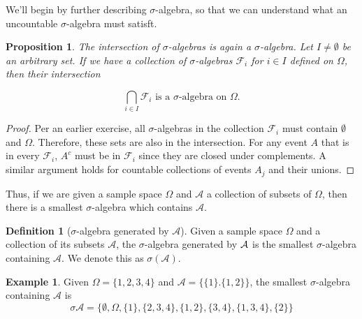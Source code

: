 \documentclass[12pt]{article}
\newcommand{\calF}{\mathcal{F}}
\newtheorem{prop}[thm]{Proposition}
\theoremstyle{definition}
\newtheorem{defn}[thm]{Definition}
\newtheorem{exmp}[thm]{Example}
\theoremstyle{remark}
\numberwithin{equation}{section}
\begin{document}

We'll begin by further describing $\sigma$-algebra, so that we can understand what an uncountable $\sigma$-algebra must satisft. %

\begin{prop}
  \emph{The intersection of $\sigma$-algebras is again a $\sigma$-algebra.} Let $I \neq \emptyset$ be an arbitrary set. If we have a collection of $\sigma$-algebras $\calF_i$ for $i\in I$ defined on $\Omega$, then their intersection 

  \begin{equation}
    \bigcap_{i\in I} \calF_i \text{ is a $\sigma$-algebra on } \Omega. 
  \end{equation}
\end{prop}

\begin{proof}
  Per an earlier exercise, all $\sigma$-algebras in the collection $\calF_i$ must contain $\emptyset$ and $\Omega$. Therefore, these sets are also in the intersection. For any event $A$ that is in every $\calF_i$, $A^c$ must be in $\calF_i$ since they are closed under complements. A similar argument holds for countable collections of events $A_j$ and their unions.
\end{proof}

Thus, if we are given a sample space $\Omega$ and $\mathcal{A}$ a collection of subsets of $\Omega$, then there is a smallest $\sigma$-algebra which contains $\mathcal{A}$. 

\begin{defn}[$\sigma$-algebra generated by $\mathcal{A}$]
  Given a sample space $\Omega$ and a collection of its subsets $\mathcal{A}$, the $\sigma$-algebra generated by $\cal{A}$ is the smallest $\sigma$-algebra containing $\mathcal{A}$. We denote this as $\sigma(\mathcal{A})$. 
\end{defn}

\begin{exmp}
  Given $\Omega = \{ 1,2,3,4 \}$ and $\mathcal{A} = \{ \{1\}. \{1,2\} \}$, the smallest $\sigma$-algebra containing $\mathcal{A}$ is
  \begin{equation}
    \sigma{\mathcal{A}} = \{\emptyset, \Omega, \{1\}, \{2,3,4\}, \{1,2\},\{3,4\},\{1,3,4\},\{2\}\}    
  \end{equation}
\end{exmp}
\end{document}
